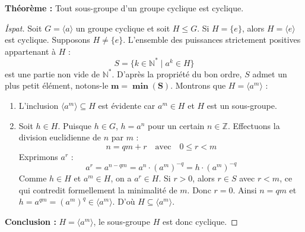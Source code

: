 \documentclass[11pt,a4paper]{article}
\begin{document}
\vspace{0.4cm}

\begin{tcolorbox}[colback=red!5!white,colframe=red!75!black,title=\textbf{İSPAT 2 : Devirli Grubun Her Alt Grubu Devirlidir}]
\textbf{Théorème :} Tout sous-groupe d'un groupe cyclique est cyclique.
\end{tcolorbox}
\begin{proof}[İspat]
Soit $G = \langle a \rangle$ un groupe cyclique et soit $H \leq G$.  
Si $H = \{e\}$, alors $H = \langle e \rangle$ est cyclique.  
Supposons $H \neq \{e\}$. L'ensemble des puissances strictement positives appartenant à $H$ :
\[ S = \{ k \in \mathbb{N}^* \mid a^k \in H \} \]
est une partie non vide de $\mathbb{N}^*$. D'après la propriété du bon ordre, $S$ admet un plus petit élément, notons-le $\mathbf{m = \min(S)}$. Montrons que $H = \langle a^m \rangle$ :
\begin{enumerate}
    \item L'inclusion $\langle a^m \rangle \subseteq H$ est évidente car $a^m \in H$ et $H$ est un sous-groupe.
    \item Soit $h \in H$. Puisque $h \in G$, $h = a^n$ pour un certain $n \in \mathbb{Z}$.  
    Effectuons la division euclidienne de $n$ par $m$ :
    \[ n = qm + r \quad \text{avec} \quad 0 \leq r < m \]
    Exprimons $a^r$ :
    \[ a^r = a^{n - qm} = a^n \cdot (a^m)^{-q} = h \cdot (a^m)^{-q} \]
    Comme $h \in H$ et $a^m \in H$, on a $a^r \in H$.  
    Si $r > 0$, alors $r \in S$ avec $r < m$, ce qui contredit formellement la minimalité de $m$.  
    Donc $r = 0$. Ainsi $n = qm$ et $h = a^{qm} = (a^m)^q \in \langle a^m \rangle$.  
    D'où $H \subseteq \langle a^m \rangle$.
\end{enumerate}
\textbf{Conclusion :} $H = \langle a^m \rangle$, le sous-groupe $H$ est donc cyclique.
\end{proof}

\vspace{0.4cm}
\end{document}
